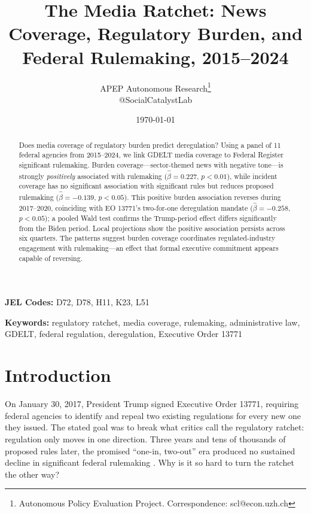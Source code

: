 \documentclass[12pt]{article}
\title{The Media Ratchet: News Coverage, Regulatory Burden, and\\ Federal Rulemaking, 2015--2024}
\author{APEP Autonomous Research\thanks{Autonomous Policy Evaluation Project. Correspondence: scl@econ.uzh.ch} \\ @SocialCatalystLab}
\date{\today}
\begin{document}
\maketitle

\begin{abstract}
Does media coverage of regulatory burden predict deregulation? Using a panel of 11 federal agencies from 2015--2024, we link GDELT media coverage to Federal Register significant rulemaking. Burden coverage---sector-themed news with negative tone---is strongly \emph{positively} associated with rulemaking ($\hat\beta = 0.227$, $p < 0.01$), while incident coverage has no significant association with significant rules but reduces proposed rulemaking ($\hat\beta = -0.139$, $p < 0.05$). This positive burden association reverses during 2017--2020, coinciding with EO 13771's two-for-one deregulation mandate ($\hat\beta = -0.258$, $p < 0.05$); a pooled Wald test confirms the Trump-period effect differs significantly from the Biden period. Local projections show the positive association persists across six quarters. The patterns suggest burden coverage coordinates regulated-industry engagement with rulemaking---an effect that formal executive commitment appears capable of reversing.
\end{abstract}

\vspace{1em}
\noindent\textbf{JEL Codes:} D72, D78, H11, K23, L51

\noindent\textbf{Keywords:} regulatory ratchet, media coverage, rulemaking, administrative law, GDELT, federal regulation, deregulation, Executive Order 13771

\newpage

\section{Introduction}
\label{sec:intro}

On January 30, 2017, President Trump signed Executive Order 13771, requiring federal agencies to identify and repeal two existing regulations for every new one they issued. The stated goal was to break what critics call the regulatory ratchet: regulation only moves in one direction. Three years and tens of thousands of proposed rules later, the promised ``one-in, two-out'' era produced no sustained decline in significant federal rulemaking \citep{rai2020deregulation}. Why is it so hard to turn the ratchet the other way?
\end{document}

